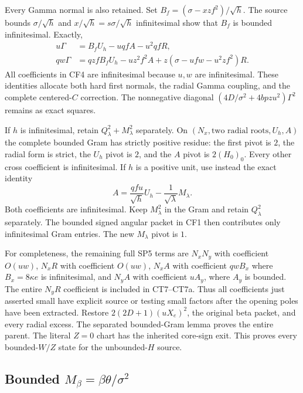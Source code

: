 Every Gamma normal is also retained. Set
$B_f=(\sigma-xzf^2)/\sqrt h$. The source bounds
$\sigma/\sqrt h$ and $x/\sqrt h=s\sigma/\sqrt h$ infinitesimal
show that $B_f$ is bounded infinitesimal. Exactly,
\[
\begin{split}
 u\Gamma&=B_fU_h-uqfA-u^2qfR,\\
 qw\Gamma&=qzfB_fU_h-uz^2f^2A
                 +z(\sigma-ufw-u^2zf^2)R.
\end{split}                                                   \tag{CF4}
\]
All coefficients in CF4 are infinitesimal because $u,w$ are
infinitesimal. These identities allocate both hard first normals,
the radial Gamma coupling, and the complete centered-$C$ correction.
The nonnegative diagonal
$(4D/\sigma^2+4bpzu^2)\Gamma^2$ remains as exact squares.

If $h$ is infinitesimal, retain $Q_\lambda^2+M_\lambda^2$
separately. On $(N_x,\text{two radial roots},U_h,A)$ the complete
bounded Gram has strictly positive residue: the first pivot is $2$,
the radial form is strict, the $U_h$ pivot is $2$, and the $A$
pivot is $2(H_0)_0$. Every other cross coefficient is infinitesimal.
If $h$ is a positive unit, use instead the exact identity
\[
 A=\frac{qfu}{\sqrt h}U_h-\frac{1}{\sqrt\lambda}M_\lambda.
                                                               \tag{CF5}
\]
Both coefficients are infinitesimal. Keep $M_\lambda^2$ in the Gram
and retain $Q_\lambda^2$ separately. The bounded signed angular
packet in CF1 then contributes only infinitesimal Gram entries.
The new $M_\lambda$ pivot is $1$.

For completeness, the remaining full SP5 terms are $N_xN_y$ with
coefficient $O(uw)$, $N_xR$ with coefficient $O(uw)$,
$N_xA$ with coefficient $qwB_x$ where $B_x=8\kappa e$ is
infinitesimal, and $N_yA$ with coefficient $uA_y$, where $A_y$ is
bounded. The entire $N_yR$ coefficient is included in CT7--CT7a.
Thus all coefficients just asserted small have explicit source or
testing small factors after the opening poles have been extracted.
Restore $2(2D+1)(uX_e)^2$, the original beta packet, and every
radial excess. The separated bounded-Gram lemma proves the entire
parent. The literal $Z=0$ chart has the inherited core-sign exit.
This proves every bounded-$W/Z$ state for the unbounded-$H$ source.

\subsection{Bounded $M_\beta=\beta\theta/\sigma^2$}

